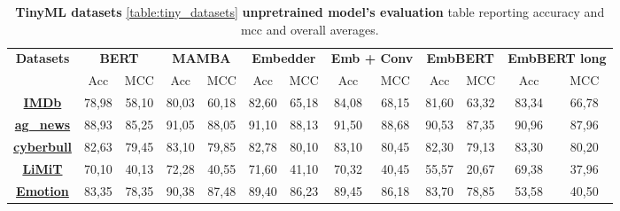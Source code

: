 \begin{table*}[htbp]
    \caption{\textbf{TinyML datasets }\ref{table:tiny_datasets} \textbf{unpretrained model's evaluation} table reporting accuracy and \gls{mcc} and overall averages.}
    \begin{center} 
    
    
        \begin{tabular}{|c | c c | c c | c c | c c | c c | c c |}
        \hline
        \multirow{2}{*}{\textbf{Datasets}} &  
            \multicolumn{2}{|c|}{\textbf{BERT}} & \multicolumn{2}{|c|}{\textbf{MAMBA}} & \multicolumn{2}{|c|}{\textbf{Embedder}} & \multicolumn{2}{|c|}{\textbf{Emb + Conv}} & \multicolumn{2}{|c|}{\textbf{EmbBERT}} & \multicolumn{2}{|c|}{\textbf{EmbBERT long}} \\
            \cline{2-13}
            & Acc & MCC & Acc & MCC & Acc & MCC & Acc & MCC & Acc & MCC & Acc & MCC \\
        
        \hline \hline
        \href{https://huggingface.co/datasets/stanfordnlp/imdb}{\textbf{IMDb}}                                  
            & 78,98 & 58,10     & 80,03 & 60,18     & 82,60 & 65,18     & 84,08 & 68,15     & 81,60 & 63,32     & 83,34 & 66,78 \\

        \href{https://huggingface.co/datasets/fancyzhx/ag_news}{\textbf{ag\_news}}                              
            & 88,93 & 85,25     & 91,05 & 88,05     & 91,10 & 88,13     & 91,50 & 88,68     & 90,53 & 87,35     & 90,96 & 87,96  \\
        
        \href{https://www.kaggle.com/datasets/andrewmvd/cyberbullying-classification}{\textbf{cyberbull}}       
            & 82,63 & 79,45     & 83,10 & 79,85     & 82,78 & 80,10     & 83,10 & 80,45     & 82,30 & 79,13     & 83,30 & 80,20 \\
        
        \href{https://huggingface.co/datasets/IBM/limit}{\textbf{LiMiT}}                                        
            & 70,10 & 40,13     & 72,28 & 40,55     & 71,60 & 41,10     & 70,32 & 40,45     & 55,57 & 20,67     & 69,38 & 37,96 \\
        
        \href{https://huggingface.co/datasets/dair-ai/emotion}{\textbf{Emotion}}                                
            & 83,35 & 78,35     & 90,38 & 87,48     & 89,40 & 86,23     & 89,45 & 86,18     & 83,70 & 78,85     & 53,58 & 40,50 \\
        

\end{tabular}
\end{center}
\end{table*}
